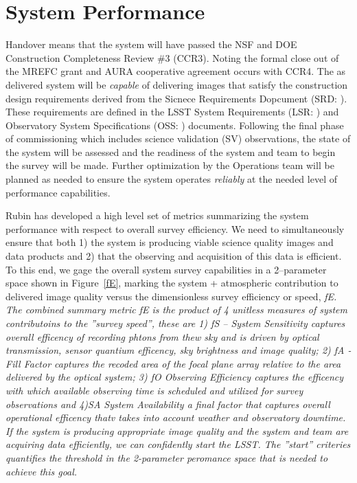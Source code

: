\section{System Performance}{\label{secSysperf}}
  
Handover means that the system will have passed the NSF and DOE Construction Completeness Review \#3 (CCR3).  Noting the formal close out of the MREFC grant and AURA cooperative agreement occurs with CCR4. The as delivered system will be {\it capable} of delivering images that satisfy the construction design requirements derived from the Sicnece Requirements Dopcument (SRD: \cite{LPM-17}).  These requirements are defined in the LSST System Requirements (LSR: \cite{LSE-29)}) and Observatory System Specifications (OSS: \cite{LSE-30}) documents. Following the final phase of commissioning which includes science validation (SV) observations, the state of the system will be assessed and the readiness of the system and team to begin the survey will be made. Further optimization by the Operations team will be planned as needed to ensure the system operates {\it reliably} at the needed level of performance capabilities. 

Rubin has developed a high level set of metrics summarizing the system performance with respect to overall survey efficiency. We need to simultaneously ensure that both 1) the system is producing viable science quality images and data products and 2) that the observing and acquisition of this data is efficient.  To this end, we gage the overall system survey capabilities in a 2--parameter space shown in Figure~\ref{fE}, marking the system + atmospheric contribution to delivered image quality versus the dimensionless survey efficiency or speed, \it{fE}.  The combined summary metric \it{fE} is the product of 4 unitless measures of system contributoins to the ''survey speed'', these are 1)  \it{fS -- System Sensitivity} captures overall efficency of recording phtons from thew sky and is driven by optical transmission, sensor quantium efficency, sky brightness and image quality; 2) \it{fA - Fill Factor} captures the recoded area of the focal plane array relative to the area delivered by the optical system; 3) \it{fO Observing Efficiency} captures the efficency with which available observing time is scheduled and utilized for survey observations and 4)\it{SA System Availability} a final factor that captures overall operational efficency thatv takes into account weather and observatory downtime.   If the system is producing appropriate image quality and the system and team are acquiring data efficiently, we can confidently start the LSST.  The ''start'' criteries quantifies the threshold in the 2-parameter peromance space that is needed to achieve this goal.


